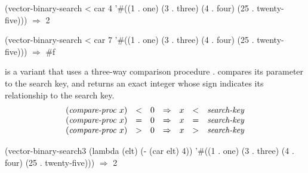 \begin{example}
(vector-binary-search < car 4 '\#((1 . one) (3 . three)
                                 (4 . four) (25 . twenty-five)))
\(\Longrightarrow\) 2

(vector-binary-search < car 7 '\#((1 . one) (3 . three)
                                 (4 . four) (25 . twenty-five)))
\(\Longrightarrow\) \#f
\end{example}    

 is a variant that uses a three-way comparison
procedure .  compares its
parameter to the search key, and returns an
exact integer whose sign indicates its relationship to the search key.
%
\[
  \begin{array}{rclcrcl}
      (\textnormal{\textit{compare-proc}}~x) &<& 0& \Rightarrow&  x &<& \textnormal{\textit{search-key}}\\
      (\textnormal{\textit{compare-proc}}~x) &=& 0& \Rightarrow&  x &=& \textnormal{\textit{search-key}}\\
      (\textnormal{\textit{compare-proc}}~x) &>& 0& \Rightarrow&  x &>& \textnormal{\textit{search-key}}
  \end{array}
\]

\begin{example}
(vector-binary-search3 (lambda (elt) (- (car elt) 4))
                       '\#((1 . one) (3 . three)
                          (4 . four) (25 . twenty-five)))
\(\Longrightarrow\) 2
\end{example}


